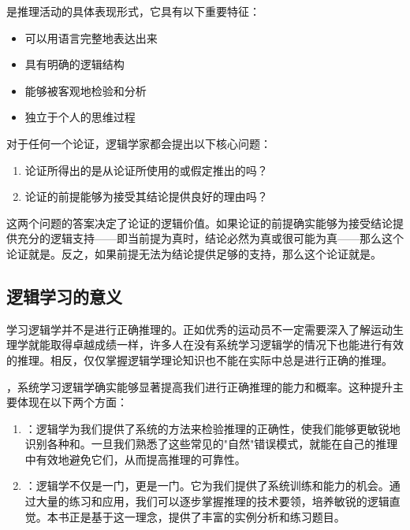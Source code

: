 \begin{theorembox}[title=论证的特征]
是推理活动的具体表现形式，它具有以下重要特征：
\begin{itemize}
  \item 可以用语言完整地表达出来
  \item 具有明确的逻辑结构
  \item 能够被客观地检验和分析
  \item 独立于个人的思维过程
\end{itemize}
\end{theorembox}

对于任何一个论证，逻辑学家都会提出以下核心问题：

\begin{examplebox}[title=逻辑学的核心问题]
\begin{enumerate}
  \item 论证所得出的是从论证所使用的或假定推出的吗？
  \item 论证的前提能够为接受其结论提供良好的理由吗？
\end{enumerate}
\end{examplebox}

这两个问题的答案决定了论证的逻辑价值。如果论证的前提确实能够为接受结论提供充分的逻辑支持——即当前提为真时，结论必然为真或很可能为真——那么这个论证就是。反之，如果前提无法为结论提供足够的支持，那么这个论证就是。

\subsection{逻辑学习的意义}

学习逻辑学并不是进行正确推理的。正如优秀的运动员不一定需要深入了解运动生理学就能取得卓越成绩一样，许多人在没有系统学习逻辑学的情况下也能进行有效的推理。相反，仅仅掌握逻辑学理论知识也不能在实际中总是进行正确的推理。

，系统学习逻辑学确实能够显著提高我们进行正确推理的能力和概率。这种提升主要体现在以下两个方面：

\begin{enumerate}
  \item {}：逻辑学为我们提供了系统的方法来检验推理的正确性，使我们能够更敏锐地识别各种和。一旦我们熟悉了这些常见的"自然"错误模式，就能在自己的推理中有效地避免它们，从而提高推理的可靠性。

  \item {}：逻辑学不仅是一门，更是一门。它为我们提供了系统训练和能力的机会。通过大量的练习和应用，我们可以逐步掌握推理的技术要领，培养敏锐的逻辑直觉。本书正是基于这一理念，提供了丰富的实例分析和练习题目。
\end{enumerate}

